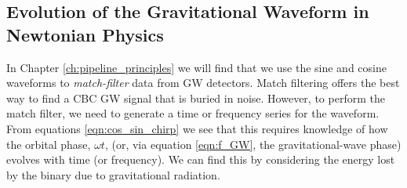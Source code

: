 \subsection{Evolution of the Gravitational Waveform in Newtonian Physics}

In Chapter \ref{ch:pipeline_principles} we will find that we use the sine and cosine waveforms to \emph{match-filter} data from \ac{GW} detectors. Match filtering offers the best way to find a \ac{CBC} \ac{GW} signal that is buried in noise. However, to perform the match filter, we need to generate a time or frequency series for the waveform. From equations \ref{eqn:cos_sin_chirp} we see that this requires knowledge of how the orbital phase, $\omega t$, (or, via equation \ref{eqn:f_GW}, the gravitational-wave phase) evolves with time (or frequency). We can find this by considering the energy lost by the binary due to gravitational radiation.

